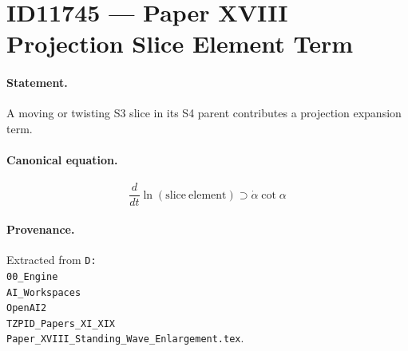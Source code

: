 \section*{ID11745 --- Paper XVIII Projection Slice Element Term}

\paragraph{Statement.}
A moving or twisting S3 slice in its S4 parent contributes a projection expansion term.

\paragraph{Canonical equation.}
\[
\frac{d}{dt}\ln(\mathrm{slice\ element})\supset\dot\alpha\cot\alpha
\]

\paragraph{Provenance.}
Extracted from \texttt{D:\\00\_Engine\\AI\_Workspaces\\OpenAI2\\TZPID\_Papers\_XI\_XIX\\Paper\_XVIII\_Standing\_Wave\_Enlargement.tex}.
